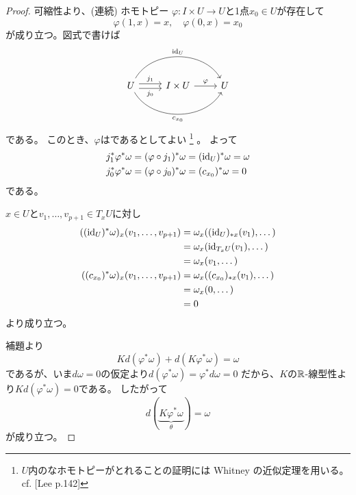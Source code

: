 \documentclass[report]{jlreq}
\begin{document}
\begin{proof}
    可縮性より、(連続) ホモトピー
    $\varphi \colon I \times U \to U$と1点$x_0 \in U$が存在して
    \begin{equation}
        \varphi(1, x) = x,
        \quad
        \varphi(0, x) = x_0
    \end{equation}
    が成り立つ。図式で書けば
    \begin{equation}
        \begin{tikzcd}[row sep=large]
            U \ar[shift left]{r}{j_1}
                \ar[shift right]{r}[swap]{j_0}
                \ar[bend left=60]{rr}{\id_U}
                \ar[bend right=60]{rr}[swap]{c_{x_0}}
                & I \times U \ar{r}{\varphi}
                & U
        \end{tikzcd}
    \end{equation}
    である。
    このとき、$\varphi$は{\smooth}であるとしてよい
    \footnote{
        $U$内の{\smooth}なホモトピーがとれることの証明には
        Whitney の近似定理を用いる。
        cf. [Lee p.142]
    }
    。
    よって
    \begin{alignat}{1}
        j_1^* \varphi^* \omega
            &= (\varphi \circ j_1)^* \omega
            = (\mathrm{id}_U)^* \omega
            = \omega \\
        j_0^* \varphi^* \omega
            &= (\varphi \circ j_0)^* \omega
            = (c_{x_0})^* \omega
            = 0
    \end{alignat}
    である。
    \begin{innerproof}
        $x \in U$と$v_1, \dots, v_{p + 1} \in T_xU$に対し
        \begin{alignat}{1}
            ((\mathrm{id}_U)^* \omega)_x (v_1, \dots, v_{p + 1})
                &= \omega_{x} ((\mathrm{id}_U)_{*x} (v_1), \dots) \\
                &= \omega_{x} (\mathrm{id}_{T_xU} (v_1), \dots) \\
                &= \omega_{x} (v_1, \dots) \\
            ((c_{x_0})^* \omega)_x (v_1, \dots, v_{p + 1})
                &= \omega_{x} ((c_{x_0})_{*x} (v_1), \dots) \\
                &= \omega_{x} (0, \dots) \\
                &= 0
        \end{alignat}
        より成り立つ。
    \end{innerproof}
    補題より
    \begin{equation}
        K d(\varphi^* \omega) + d(K \varphi^* \omega) = \omega
    \end{equation}
    であるが、いま$d\omega = 0$の仮定より$d(\varphi^* \omega) = \varphi^* d\omega = 0$
    だから、$K$の$\mathbb{R}$-線型性より$K d(\varphi^* \omega) = 0$である。
    したがって
    \begin{equation}
        d(\underbrace{K \varphi^* \omega}_{\theta}) = \omega
    \end{equation}
    が成り立つ。
\end{proof}
\end{document}
